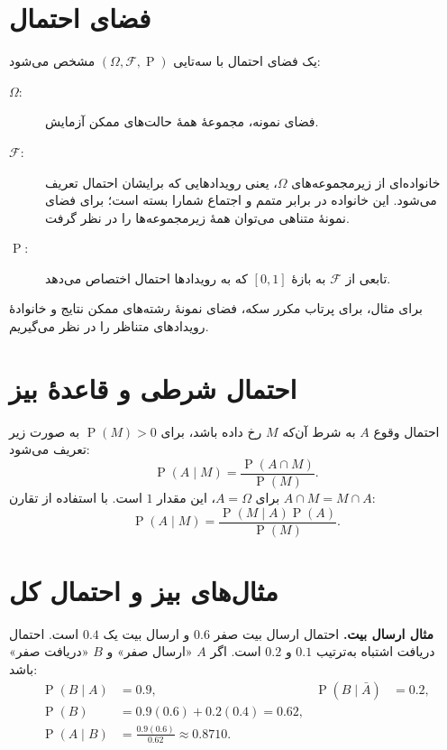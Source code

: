 \documentclass[12pt,a4paper,oneside]{book}
\newcommand{\Prob}{\operatorname{P}}
\begin{document}
\section{فضای احتمال}
یک فضای احتمال با سه‌تایی $(\Omega,\mathcal F,\Prob)$ مشخص می‌شود:
\begin{description}
\item[$\Omega$:] فضای نمونه، مجموعهٔ همهٔ حالت‌های ممکن آزمایش.
\item[$\mathcal F$:] خانواده‌ای از زیرمجموعه‌های $\Omega$، یعنی رویدادهایی که برایشان احتمال تعریف می‌شود. این خانواده در برابر متمم و اجتماع شمارا بسته است؛ برای فضای نمونهٔ متناهی می‌توان همهٔ زیرمجموعه‌ها را در نظر گرفت.
\item[$\Prob$:] تابعی از $\mathcal F$ به بازهٔ $[0,1]$ که به رویدادها احتمال اختصاص می‌دهد.
\end{description}
برای مثال، برای پرتاب مکرر سکه، فضای نمونهٔ رشته‌های ممکن نتایج و خانوادهٔ رویدادهای متناظر را در نظر می‌گیریم.

\section{احتمال شرطی و قاعدهٔ بیز}
احتمال وقوع $A$ به شرط آن‌که $M$ رخ داده باشد، برای $\Prob(M)>0$ به صورت زیر تعریف می‌شود:
\begin{equation}\label{eq:conditional}
\Prob(A\mid M)=\frac{\Prob(A\cap M)}{\Prob(M)}.
\end{equation}
برای $A=\Omega$، این مقدار $1$ است. با استفاده از تقارن $A\cap M=M\cap A$:
\begin{equation}\label{eq:bayes}
\Prob(A\mid M)=\frac{\Prob(M\mid A)\Prob(A)}{\Prob(M)}.
\end{equation}

\section{مثال‌های بیز و احتمال کل}
\textbf{مثال ارسال بیت.} احتمال ارسال بیت صفر $0.6$ و ارسال بیت یک $0.4$ است. احتمال دریافت اشتباه به‌ترتیب $0.1$ و $0.2$ است. اگر $A$ «ارسال صفر» و $B$ «دریافت صفر» باشد:
\begin{align*}
\Prob(B\mid A)&=0.9,&\Prob(B\mid\bar A)&=0.2,\\
\Prob(B)&=0.9(0.6)+0.2(0.4)=0.62,\\
\Prob(A\mid B)&=\frac{0.9(0.6)}{0.62}\approx0.8710.
\end{align*}
\end{document}
